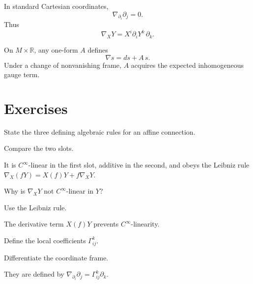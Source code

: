 \begin{example}\label{ex:vii21-flat}
In standard Cartesian coordinates,
\[
\nabla_{\partial_i}\partial_j=0.
\]
Thus
\[
\nabla_XY=X^i\partial_iY^k\,\partial_k.
\]
\end{example}

\begin{example}\label{ex:vii21-line}
On \(M\times\mathbb R\), any one-form \(A\) defines
\[
\nabla s=ds+A\,s.
\]
Under a change of nonvanishing frame, \(A\) acquires the expected inhomogeneous
gauge term.
\end{example}

\section{Exercises}

\begin{exercise}\label{exr:vii21-01}
State the three defining algebraic rules for an affine connection.
\end{exercise}
\begin{hint}
Compare the two slots.
\end{hint}
\begin{solution}
It is \(C^\infty\)-linear in the first slot, additive in the second, and obeys the Leibniz rule \(\nabla_X(fY)=X(f)Y+f\nabla_XY\).
\end{solution}

\begin{exercise}\label{exr:vii21-02}
Why is \(\nabla_XY\) not \(C^\infty\)-linear in \(Y\)?
\end{exercise}
\begin{hint}
Use the Leibniz rule.
\end{hint}
\begin{solution}
The derivative term \(X(f)Y\) prevents \(C^\infty\)-linearity.
\end{solution}

\begin{exercise}\label{exr:vii21-03}
Define the local coefficients \(\Gamma^k_{ij}\).
\end{exercise}
\begin{hint}
Differentiate the coordinate frame.
\end{hint}
\begin{solution}
They are defined by \(\nabla_{\partial_i}\partial_j=\Gamma^k_{ij}\partial_k\).
\end{solution}

